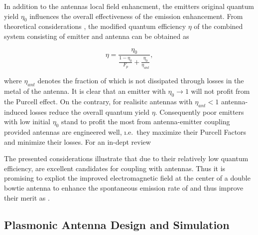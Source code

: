 		In addition to the antennas local field enhancment, the emitters original quantum yield $\eta_0$ influences the overall effectiveness of the emission enhancement. From theoretical considerations \cite{nancy::thesis, nancy::140, nancy::162, nancy::163}, the modified quantum efficiency $\eta$ of the combined system consisting of emitter and antenna can be obtained as

		\begin{equation}
			\eta = \frac{\eta_0}{\frac{1-\eta_0}{F_p} + \frac{\eta_0}{\eta_{ant}} },
		\end{equation}

		where $\eta_{ant}$ denotes the fraction of \fl which is not dissipated through losses in the metal of the antenna. It is clear that an emitter with $\eta_0 \to 1$ will not profit from the Purcell effect. On the contrary, for realisitc antennas with $\eta_{ant} < 1$ antenna-induced losses reduce the overall quantum yield $\eta$. Consequently poor emitters with low initial $\eta_{0}$ stand to profit the most from antenna-emitter coupling provided antennas are engineered well, \i.e.\ they maximize their Purcell Factors and minimize their losses. For an in-dept review

		The presented considerations illustrate that due to their relatively low quantum efficiency, \sivs are excellent candidates for coupling with antennas. Thus it is promising to expliot the improved electromagnetic field at the center of a double bowtie antenna to enhance the spontaneous emission rate of \sivs and thus improve their merit as \spss.

	\subsection{Plasmonic Antenna Design and Simulation} \label{sec::structure_antenna}

